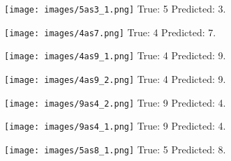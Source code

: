 \documentclass[a4paper]{scrartcl}
\begin{document}
\begin{minipage}[t]{0.2\textwidth}
\begin{center}
\texttt{[image: images/5as3\_1.png]}
\newline True: 5 \newline Predicted: 3.
\end{center}
\end{minipage}
\par
\vspace{2em}
\begin{minipage}[t]{0.2\textwidth}
\begin{center}
\texttt{[image: images/4as7.png]}
\newline True: 4 \newline Predicted: 7.
\end{center}
\end{minipage}
\begin{minipage}[t]{0.2\textwidth}
\begin{center}
\texttt{[image: images/4as9\_1.png]}
\newline True: 4 \newline Predicted: 9.
\end{center}
\end{minipage}
\begin{minipage}[t]{0.2\textwidth}
\begin{center}
\texttt{[image: images/4as9\_2.png]}
\newline True: 4 \newline Predicted: 9.
\end{center}
\end{minipage}
\begin{minipage}[t]{0.2\textwidth}
\begin{center}
\texttt{[image: images/9as4\_2.png]}
\newline True: 9 \newline Predicted: 4.
\end{center}
\end{minipage}
\begin{minipage}[t]{0.2\textwidth}
\begin{center}
\texttt{[image: images/9as4\_1.png]}
\newline True: 9 \newline Predicted: 4.
\end{center}
\end{minipage}
\par
\vspace{2em}
\begin{minipage}[t]{0.2\textwidth}
\begin{center}
\texttt{[image: images/5as8\_1.png]}
\newline True: 5 \newline Predicted: 8.
\end{center}
\end{minipage}
\end{document}
